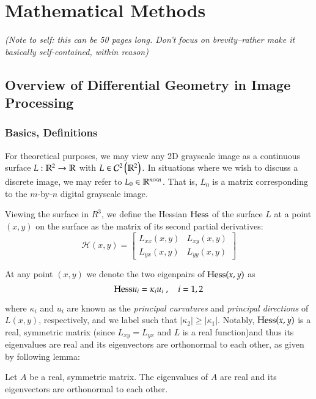 \chapter{Mathematical Methods}

\textit{(Note to self: this can be 50 pages long. Don't focus on brevity--rather make it basically self-contained, within reason)}


\section{Overview of Differential Geometry in Image Processing}
	\subsection{Basics, Definitions}
	For theoretical purposes, we may view any 2D grayscale image
	as a continuous surface $L: \mathbb{R}^2 \to \mathbb{R}$
	with $L \in \mathcal{C}^2\left(\mathbb{R}^2\right).$
	In situations where we wish to discuss a discrete image, we may refer to
	$L_0 \in \mathbb{R}^{m\times n}$. That is, $L_0$ is a matrix corresponding to the $m$-by-$n$ digital grayscale image.
	
	
	Viewing the surface in $R^3$, we define the Hessian $\mathrm{Hess}$ of the surface $L$
	at a point $(x,y)$ on the surface as the matrix of its second partial derivatives:
	\begin{equation}
\mathcal{H}(x,y) = \begin{bmatrix}
		L_{xx}(x,y) & L_{xy}(x,y) \\
		L_{yx}(x,y) & L_{yy}(x,y)
	\end{bmatrix}
	\end{equation}
	
	At any point $(x,y)$ we denote the two eigenpairs of $\mathrm{Hess}(x,y)$ as
	\begin{equation}
		\mathrm{Hess} u_i = \kappa_i u_i \; , \quad i = 1,2
	\end{equation}
	
	where $\kappa_i$ and $u_i$ are known as the
	\textit{principal curvatures} and \textit{principal directions} of $L(x,y)$, respectively, and we label such that $|\kappa_2| \ge |\kappa_1|$. Notably, $\mathrm{Hess}(x,y)$ is a real, symmetric matrix (since  $L_{xy} = L_{yx}$ and $L$ is a real function)and thus its eigenvalues are real and its eigenvectors are orthonormal to each other, as given by following lemma:
	
	\begin{lemma}
		Let $A$ be a real, symmetric matrix. The eigenvalues of $A$ are real and its eigenvectors are orthonormal to each other.
	\end{lemma}
	
